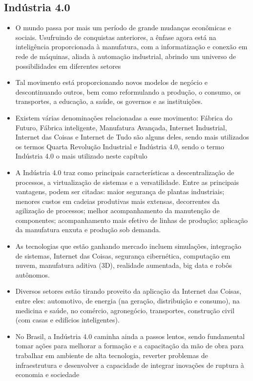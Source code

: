\documentclass{article}
\begin{document}
\subsection{Indústria 4.0}

\begin{itemize}
    \item O mundo passa por mais um período de grande mudanças econômicas e sociais. Usufruindo de conquistas anteriores, a ênfase agora está na inteligência proporcionada à manufatura, com a informatização e conexão em rede de máquinas, aliada à automação industrial, abrindo um universo de possibilidades em diferentes setores
    \item Tal movimento está proporcionando novos modelos de negócio e descontinuando outros, bem como reformulando a produção, o consumo, os transportes, a educação, a saúde, os governos e as instituições.
    \item  Existem várias denominações relacionadas a esse movimento: Fábrica do Futuro, Fábrica inteligente, Manufatura Avançada, Internet Industrial, Internet das Coisas e Internet de Tudo são alguns deles, sendo mais utilizados os termos Quarta Revolução Industrial e Indústria 4.0, sendo o termo Indústria 4.0 o mais utilizado neste capítulo
    \item A Indústria 4.0 traz como principais características a descentralização de processos, a virtualização de sistemas e a versatilidade. Entre as principais vantagens, podem ser citadas: maior segurança de plantas industriais; menores custos em cadeias produtivas mais extensas, decorrentes da agilização de processos; melhor acompanhamento da manutenção de componentes; acompanhamento mais efetivo de linhas de produção; aplicação da manufatura enxuta e produção sob demanda.
    \item As tecnologias que estão ganhando mercado incluem simulações, integração de sistemas, Internet das Coisas, segurança cibernética, computação em nuvem, manufatura aditiva (3D), realidade aumentada, big data e robôs autônomos.
    \item Diversos setores estão tirando proveito da aplicação da Internet das Coisas, entre eles: automotivo, de energia (na geração, distribuição e consumo), na medicina e saúde, no comércio, agronegócio, transportes, construção civil (com casas e edifícios inteligentes).
    \item No Brasil, a Indústria 4.0 caminha ainda a passos lentos, sendo fundamental tomar ações para melhorar a formação e a capacitação da mão de obra para trabalhar em ambiente de alta tecnologia, reverter problemas de infraestrutura e desenvolver a capacidade de integrar inovações de ruptura à economia e sociedade

\end{itemize}
\end{document}
